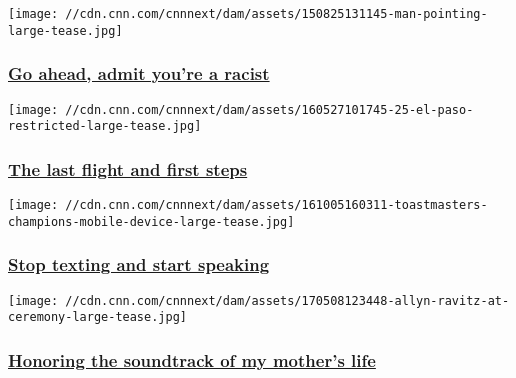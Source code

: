 \href{/2015/09/02/us/admitting-racism/index.html}{}

\texttt{[image: //cdn.cnn.com/cnnnext/dam/assets/150825131145-man-pointing-large-tease.jpg]}

\hypertarget{go-ahead-admit-youre-a-racist}{%
\subsubsection{\texorpdfstring{\href{/2015/09/02/us/admitting-racism/index.html}{Go
ahead, admit you're a
racist}}{Go ahead, admit you're a racist}}\label{go-ahead-admit-youre-a-racist}}

\href{/2016/05/31/us/border-cuban-migrants-el-paso/index.html}{}

\texttt{[image: //cdn.cnn.com/cnnnext/dam/assets/160527101745-25-el-paso-restricted-large-tease.jpg]}

\hypertarget{the-last-flight-and-first-steps}{%
\subsubsection{\texorpdfstring{\href{/2016/05/31/us/border-cuban-migrants-el-paso/index.html}{The
last flight and first
steps}}{The last flight and first steps}}\label{the-last-flight-and-first-steps}}

\href{/2016/10/14/us/toastmasters-champions/index.html}{}

\texttt{[image: //cdn.cnn.com/cnnnext/dam/assets/161005160311-toastmasters-champions-mobile-device-large-tease.jpg]}

\hypertarget{stop-texting-and-start-speaking}{%
\subsubsection{\texorpdfstring{\href{/2016/10/14/us/toastmasters-champions/index.html}{Stop
texting and start
speaking}}{Stop texting and start speaking}}\label{stop-texting-and-start-speaking}}

\href{/2017/05/12/health/soundtrack-mothers-day-allyn-ravitz/index.html}{}

\texttt{[image: //cdn.cnn.com/cnnnext/dam/assets/170508123448-allyn-ravitz-at-ceremony-large-tease.jpg]}

\hypertarget{honoring-the-soundtrack-of-my-mothers-life}{%
\subsubsection{\texorpdfstring{\href{/2017/05/12/health/soundtrack-mothers-day-allyn-ravitz/index.html}{Honoring
the soundtrack of my mother's
life}}{Honoring the soundtrack of my mother's life}}\label{honoring-the-soundtrack-of-my-mothers-life}}

